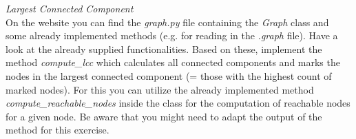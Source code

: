   \textit{Largest Connected Component}\\
On the website you can find the \emph{graph.py} file containing the \emph{Graph}
class and some already implemented methods (e.g. for reading in the \emph{.graph}
file). Have a look at the already supplied functionalities. Based on these, implement
the method \emph{compute\_lcc} which calculates all connected components and marks
the nodes in the largest connected component (= those with the highest count of
marked nodes). For this you can utilize the already implemented method
\emph{compute\_reachable\_nodes} inside the class for the computation of reachable
nodes for a given node. Be aware that you might need to adapt the output of
the method for this exercise.


